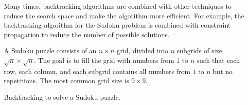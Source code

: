 Many times, backtracking algorithms are combined with other techniques to reduce the
search space and make the algorithm more efficient.  For example, the backtracking
algorithm for the Sudoku problem is combined with constraint propagation to reduce the
number of possible solutions.

\clearpage
A Sudoku puzzle consists of an $n \times n$ grid, divided into $n$ subgrids of size
$\sqrt{n} \times \sqrt{n}$.  The goal is to fill the grid with numbers from $1$ to $n$
such that each row, each column, and each subgrid contains all numbers from $1$ to $n$ but
no repetitions.  The most common grid size is $9 \times 9$.

\begin{figurebox}[label=fig:sudoku]{Backtracking to solve a Sudoku puzzle.}
  \centering
  \begin{tikzpicture}


\end{tikzpicture}
\end{figurebox}
